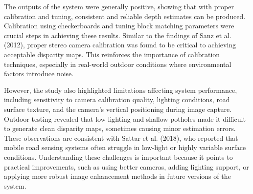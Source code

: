 The outputs of the system were generally positive, showing that with proper calibration and tuning, consistent and reliable depth estimates can be produced. Calibration using checkerboards and tuning block matching parameters were crucial steps in achieving these results. Similar to the findings of Sanz et al. (2012), proper stereo camera calibration was found to be critical to achieving acceptable disparity maps. This reinforces the importance of calibration techniques, especially in real-world outdoor conditions where environmental factors introduce noise.

However, the study also highlighted limitations affecting system performance, including sensitivity to camera calibration quality, lighting conditions, road surface texture, and the camera's vertical positioning during image capture. Outdoor testing revealed that low lighting and shallow potholes made it difficult to generate clean disparity maps, sometimes causing minor estimation errors. These observations are consistent with Sattar et al. (2018), who reported that mobile road sensing systems often struggle in low-light or highly variable surface conditions. Understanding these challenges is important because it points to practical improvements, such as using better cameras, adding lighting support, or applying more robust image enhancement methods in future versions of the system.
